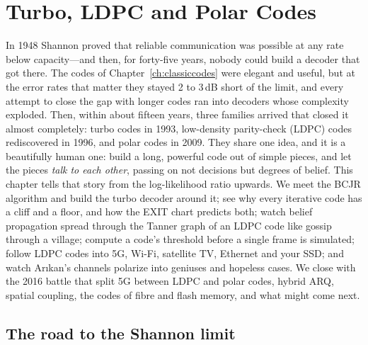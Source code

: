 \chapter{Turbo, LDPC and Polar Codes}
\label{ch:moderncodes}

\begin{chapterintro}
In 1948 Shannon proved that reliable communication was possible at any rate below capacity---and
then, for forty-five years, nobody could build a decoder that got there. The codes of
Chapter~\ref{ch:classiccodes} were elegant and useful, but at the error rates that matter they
stayed 2 to 3\,dB short of the limit, and every attempt to close the gap with longer codes ran into
decoders whose complexity exploded. Then, within about fifteen years, three families arrived that
closed it almost completely: turbo codes in 1993, low-density parity-check (LDPC) codes
rediscovered in 1996, and polar codes in 2009. They share one idea, and it is a beautifully human
one: build a long, powerful code out of simple pieces, and let the pieces \emph{talk to each
other}, passing on not decisions but degrees of belief. This chapter tells that story from the
log-likelihood ratio upwards. We meet the BCJR algorithm and build the turbo decoder around it;
see why every iterative code has a cliff and a floor, and how the EXIT chart predicts both; watch
belief propagation spread through the Tanner graph of an LDPC code like gossip through a village;
compute a code's threshold before a single frame is simulated; follow LDPC codes into 5G, Wi-Fi,
satellite TV, Ethernet and your SSD; and watch Ar\i kan's channels polarize into geniuses and
hopeless cases. We close with the 2016 battle that split 5G between LDPC and polar codes, hybrid
ARQ, spatial coupling, the codes of fibre and flash memory, and what might come next.
\end{chapterintro}


\section{The road to the Shannon limit}
\label{sec:ch15:road}

